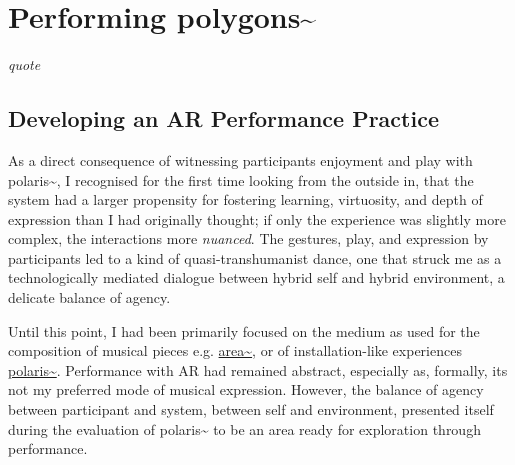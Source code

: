 \chapter{Performing polygons\textasciitilde{}}
\label{sec: polygons}
\epigraph{\emph{quote}}{\citep[]{bilbow2022}}
\section{Developing an AR Performance Practice} \label{sec: polygons-developing}
As a direct consequence of witnessing participants enjoyment and play with polaris\textasciitilde{}, I recognised for the first time looking from the outside in, that the system had a larger propensity for fostering learning, virtuosity, and depth of expression than I had originally thought; if only the experience was slightly more complex, the interactions more \textit{nuanced}. The gestures, play, and expression by participants led to a kind of quasi-transhumanist dance, one that struck me as a technologically mediated dialogue between hybrid self and hybrid environment, a delicate balance of agency.

Until this point, I had been primarily focused on the medium as used for the composition of musical pieces e.g. \hyperref[sec: area]{area\textasciitilde{}}, or of installation-like experiences \hyperref[sec: polaris]{polaris\textasciitilde{}}. Performance with AR had remained abstract, especially as, formally, its not my preferred mode of musical expression. However, the balance of agency between participant and system, between self and environment, presented itself during the evaluation of polaris\textasciitilde{} to be an area ready for exploration through performance. 

